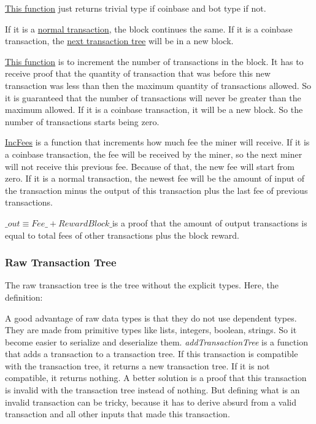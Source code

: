 
\hyperref[iscoinbase]{This function} just returns trivial type if coinbase and bot type if not.


If it is a \hyperref[tx]{normal transaction}, the block continues the same.
If it is a coinbase transaction, the \hyperref[txtree]{next transaction tree} will be in a new block.


\hyperref[incqttx]{This function} is to increment the number of transactions in the block.
It has to receive proof that the quantity of transaction that was before this new transaction was
less than then the maximum quantity of transactions allowed.
So it is guaranteed that the number of transactions will never be greater than the maximum allowed.
If it is a coinbase transaction, it will be a new block.
So the number of transactions starts being zero.


\hyperref[incfees]{IncFees} is a function that increments how much fee the miner will receive.
If it is a coinbase transaction, the fee will be received by the miner,
so the next miner will not receive this previous fee.
Because of that, the new fee will start from zero.
If it is a normal transaction, the newest fee will be the amount of input of the transaction minus
the output of this transaction plus the last fee of previous transactions.


$\_out≡Fee\_+RewardBlock\_$is a proof that the amount of output transactions is equal to total fees of
other transactions plus the block reward.

\subsubsection{Raw Transaction Tree}

The raw transaction tree is the tree without the explicit types.
Here, the definition:


A good advantage of raw data types is that they do not use dependent types.
They are made from primitive types like lists, integers, boolean, strings.
So it become easier to serialize and deserialize them.
\emph{addTransactionTree} is a function that adds a transaction to a transaction tree.
If this transaction is compatible with the transaction tree,
it returns a new transaction tree.
If it is not compatible, it returns nothing.
A better solution is a proof that this transaction is invalid with the transaction tree
instead of nothing.
But defining what is an invalid transaction can be tricky,
because it has to derive absurd from a valid transaction and all other inputs that
made this transaction.

